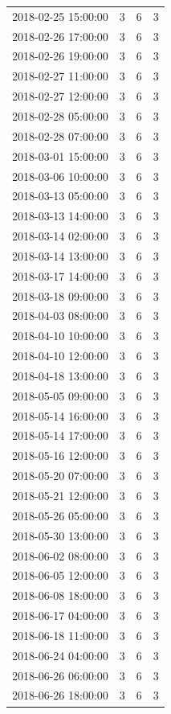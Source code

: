 \begin{tabular}{lrrr}
2018-02-25 15:00:00 & 3 & 6 & 3 \\
2018-02-26 17:00:00 & 3 & 6 & 3 \\
2018-02-26 19:00:00 & 3 & 6 & 3 \\
2018-02-27 11:00:00 & 3 & 6 & 3 \\
2018-02-27 12:00:00 & 3 & 6 & 3 \\
2018-02-28 05:00:00 & 3 & 6 & 3 \\
2018-02-28 07:00:00 & 3 & 6 & 3 \\
2018-03-01 15:00:00 & 3 & 6 & 3 \\
2018-03-06 10:00:00 & 3 & 6 & 3 \\
2018-03-13 05:00:00 & 3 & 6 & 3 \\
2018-03-13 14:00:00 & 3 & 6 & 3 \\
2018-03-14 02:00:00 & 3 & 6 & 3 \\
2018-03-14 13:00:00 & 3 & 6 & 3 \\
2018-03-17 14:00:00 & 3 & 6 & 3 \\
2018-03-18 09:00:00 & 3 & 6 & 3 \\
2018-04-03 08:00:00 & 3 & 6 & 3 \\
2018-04-10 10:00:00 & 3 & 6 & 3 \\
2018-04-10 12:00:00 & 3 & 6 & 3 \\
2018-04-18 13:00:00 & 3 & 6 & 3 \\
2018-05-05 09:00:00 & 3 & 6 & 3 \\
2018-05-14 16:00:00 & 3 & 6 & 3 \\
2018-05-14 17:00:00 & 3 & 6 & 3 \\
2018-05-16 12:00:00 & 3 & 6 & 3 \\
2018-05-20 07:00:00 & 3 & 6 & 3 \\
2018-05-21 12:00:00 & 3 & 6 & 3 \\
2018-05-26 05:00:00 & 3 & 6 & 3 \\
2018-05-30 13:00:00 & 3 & 6 & 3 \\
2018-06-02 08:00:00 & 3 & 6 & 3 \\
2018-06-05 12:00:00 & 3 & 6 & 3 \\
2018-06-08 18:00:00 & 3 & 6 & 3 \\
2018-06-17 04:00:00 & 3 & 6 & 3 \\
2018-06-18 11:00:00 & 3 & 6 & 3 \\
2018-06-24 04:00:00 & 3 & 6 & 3 \\
2018-06-26 06:00:00 & 3 & 6 & 3 \\
2018-06-26 18:00:00 & 3 & 6 & 3 \\

\end{tabular}
